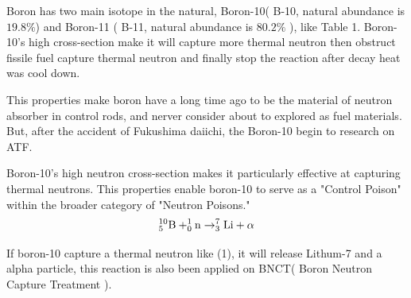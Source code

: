 \documentclass[final,10pt,times,twocolumn]{elsarticle}
\begin{document}
\begin{table}[ht]
    \centering
    \caption{The abundance and thermal neutron cross-section reaction type}
    \label{tab:my-table}
\end{table}

Boron has two main isotope in the natural, Boron-10( B-10, natural abundance is $19.8\%$) and Boron-11 ( B-11, natural abundance is $80.2\%$ ), like Table 1. Boron-10's high cross-section make it will capture more thermal neutron then obstruct fissile fuel capture thermal neutron and finally stop the reaction after decay heat was cool down.

This properties make boron have a long time ago to be the material of neutron absorber in control rods, and nerver consider about to explored as fuel materials. But, after the accident of Fukushima daiichi, the Boron-10 begin to research on ATF.

Boron-10's high neutron cross-section makes it particularly effective at capturing thermal neutrons. This properties enable boron-10 to serve as a "Control Poison" within the broader category of "Neutron Poisons."\\

\begin{equation}
    ^{10}_{5}\ce{B} + ^{1}_{0}\ce{n} \rightarrow ^{7}_{3}\ce{Li} + \alpha    
\end{equation}

If boron-10 capture a thermal neutron like (1), it will release Lithum-7 and a alpha particle, this reaction is also been applied on BNCT( Boron Neutron Capture Treatment ).
\end{document}
